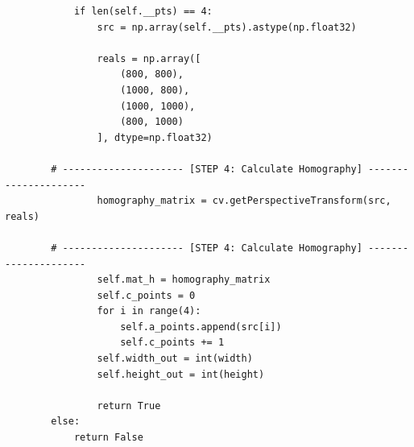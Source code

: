 \documentclass[a4paper, 12pt]{article}
\begin{document}
\begin{lstlisting}
            if len(self.__pts) == 4:
                src = np.array(self.__pts).astype(np.float32)

                reals = np.array([
                    (800, 800),
                    (1000, 800),
                    (1000, 1000),
                    (800, 1000)
                ], dtype=np.float32)

        # --------------------- [STEP 4: Calculate Homography] ---------------------
                homography_matrix = cv.getPerspectiveTransform(src, reals)

        # --------------------- [STEP 4: Calculate Homography] ---------------------
                self.mat_h = homography_matrix
                self.c_points = 0
                for i in range(4):
                    self.a_points.append(src[i])
                    self.c_points += 1
                self.width_out = int(width)
                self.height_out = int(height)

                return True
        else:
            return False
	\end{lstlisting}
\end{document}
